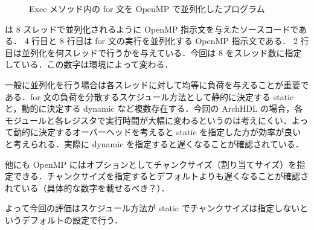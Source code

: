 \begin{figure}[t]
 
 \caption{Exec メソッド内の for 文を OpenMP で並列化したプログラム}
 \label{src:exec_openmp}
\end{figure}

 は 8 スレッドで並列化されるように OpenMP 指示文を与えたソースコードである．
4 行目と 8 行目は for 文の実行を並列化する OpenMP 指示文である．
2 行目は並列化を何スレッドで行うかを与えている．今回は 8 をスレッド数に指定している．この数字は環境によって変わる．

一般に並列化を行う場合は各スレッドに対して均等に負荷を与えることが重要である．for
文の負荷を分散するスケジュール方法として静的に決定する static
と，動的に決定する dynamic など複数存在する．今回の ArchHDL
の場合，各モジュールと各レジスタで実行時間が大幅に変わるというのは考えにくい．よって動的に決定するオーバーヘッドを考えると
static を指定した方が効率が良いと考えられる．実際に dynamic
を指定すると遅くなることが確認されている．

他にも OpenMP
にはオプションとしてチャンクサイズ（割り当てサイズ）を指定できる．チャンクサイズを指定するとデフォルトよりも遅くなることが確認されている（具体的な数字を載せるべき？）．

よって今回の評価はスケジュール方法が static
でチャンクサイズは指定しないというデフォルトの設定で行う．
